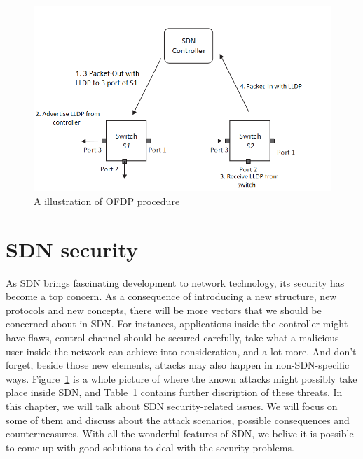 \begin{figure}[H]
\begin{center} 
\includegraphics[width=1\textwidth]{figures/OFDP_procedure.png}
\end{center}
\caption{A illustration of OFDP procedure}
\label{OFDP}
\end{figure}

\section{SDN security}
As SDN brings fascinating development to network technology, its security has become a top concern. As a consequence of introducing a new structure, new protocols and new concepts, there will be more vectors that we should be concerned about in SDN. For instances, applications inside the controller might have flaws, control channel should be secured carefully, take what a malicious user inside the network can achieve into consideration, and a lot more. And don't forget, beside those new elements, attacks may also happen in non-SDN-specific ways. Figure~\ref{} is a whole picture of where the known attacks might possibly take place inside SDN, and Table~\ref{} contains further discription of these threats. In this chapter, we will talk about SDN security-related issues. We will focus on some of them and discuss about the attack scenarios, possible consequences and countermeasures. With all the wonderful features of SDN, we belive it is possible to come up with good solutions to deal with the security problems.

